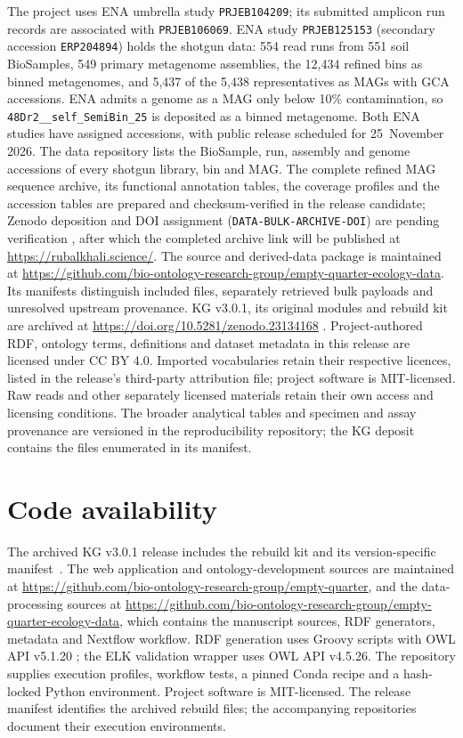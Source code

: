 \begin{revision}
The project uses ENA umbrella study \texttt{PRJEB104209}; its submitted
amplicon run records are associated with \texttt{PRJEB106069}.
ENA study \texttt{PRJEB125153} (secondary accession \texttt{ERP204894})
holds the shotgun data: 554 read runs from 551 soil BioSamples, 549
primary metagenome assemblies, the 12,434 refined bins as binned
metagenomes, and 5,437 of the 5,438 representatives as MAGs with GCA
accessions. ENA admits a genome as a MAG only below 10\% contamination,
so \texttt{48Dr2\_\_self\_SemiBin\_25} is deposited as a binned
metagenome. Both ENA studies have assigned accessions, with public release scheduled
for 25~November 2026. The data repository lists the BioSample, run,
assembly and genome accessions of every shotgun library, bin and MAG.
The complete refined MAG sequence archive, its functional annotation
tables, the coverage profiles and the accession tables are prepared and
checksum-verified in the release candidate; Zenodo deposition and DOI
assignment (\texttt{DATA-BULK-ARCHIVE-DOI}) are pending verification
\cite{rubalkhali_mags_v1}, after which the completed archive link will
be published at \url{https://rubalkhali.science/}.
The source and derived-data package is maintained at
\url{https://github.com/bio-ontology-research-group/empty-quarter-ecology-data}.
Its manifests distinguish included files, separately retrieved bulk
payloads and unresolved upstream provenance. KG v3.0.1, its original modules
and rebuild kit are archived at
\url{https://doi.org/10.5281/zenodo.23134168} \cite{rubalkhali_kg301}.
Project-authored RDF, ontology terms, definitions and dataset metadata in
this release are licensed under CC BY 4.0. Imported vocabularies retain
their respective licences, listed in the release's third-party attribution
file; project software is MIT-licensed. Raw reads and other separately
licensed materials retain their own access and licensing conditions.
The broader analytical tables and specimen and assay provenance are versioned in the
reproducibility repository; the KG deposit contains the files enumerated
in its manifest.

\section{Code availability}\label{code}
The archived KG v3.0.1 release includes the rebuild kit and its version-specific manifest~\cite{rubalkhali_kg301}. The web application and ontology-development sources are maintained at \url{https://github.com/bio-ontology-research-group/empty-quarter}, and the data-processing sources at \url{https://github.com/bio-ontology-research-group/empty-quarter-ecology-data}, which contains the manuscript sources, RDF generators, metadata and Nextflow workflow. RDF generation uses Groovy scripts with OWL API v5.1.20 \cite{owlapi}; the ELK validation wrapper uses OWL API v4.5.26. The repository supplies execution profiles, workflow tests, a pinned Conda recipe and a hash-locked Python environment. Project software is MIT-licensed. The release manifest identifies the archived rebuild files; the accompanying repositories document their execution environments.

\end{revision}
